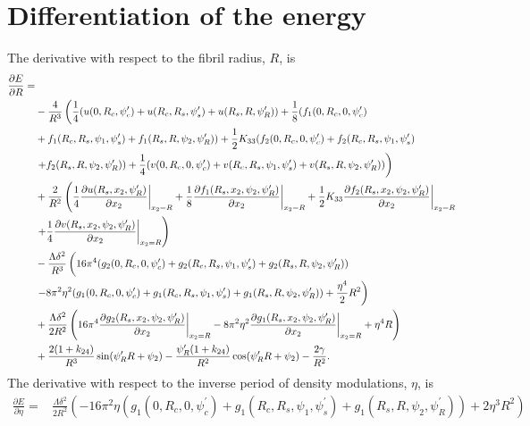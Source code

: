 \documentclass[12pt]{article}
\begin{document}
\section{Differentiation of the energy}
The derivative with respect to the fibril radius, $R$, is
\begin{align}
\frac{\partial E}{\partial R}=&\nonumber\\
&-\frac{4}{R^3}\left(\frac{1}{4}(u(0,R_c,\psi_c^{\prime})+u(R_c,R_s,\psi_s^{\prime})+u(R_s,R,\psi_R^{\prime}))+\frac{1}{8}(f_1(0,R_c,0,\psi_c^{\prime})\right.\nonumber\\
&+f_1(R_c,R_s,\psi_1,\psi_s^{\prime})+f_1(R_s,R,\psi_2,\psi_R^{\prime}))+\frac{1}{2}K_{33}(f_2(0,R_c,0,\psi_c^{\prime})+f_2(R_c,R_s,\psi_1,\psi_s^{\prime})\nonumber\\
&\left.+f_2(R_s,R,\psi_2,\psi_R^{\prime}))+\frac{1}{4}(v(0,R_c,0,\psi_c^{\prime})+v(R_c,R_s,\psi_1,\psi_s^{\prime})+v(R_s,R,\psi_2,\psi_R^{\prime}))\right)\nonumber\\
&+\frac{2}{R^2}\left(\frac{1}{4}\frac{\partial u(R_s,x_2,\psi_R^{\prime})}{\partial x_2}\bigg|_{x_2=R}+\frac{1}{8}\frac{\partial f_1(R_s,x_2,\psi_2,\psi_R^{\prime})}{\partial x_2}\bigg|_{x_2=R}+\frac{1}{2}K_{33}\frac{\partial f_2(R_s,x_2,\psi_2,\psi_R^{\prime})}{\partial x_2}\bigg|_{x_2=R}\right.\nonumber\\
&\left.+\frac{1}{4}\frac{\partial v(R_s,x_2,\psi_2,\psi_R^{\prime})}{\partial x_2}\bigg|_{x_2=R}\right)\nonumber\\
&-\frac{\Lambda\delta^2}{R^3}\left(\vphantom{\frac{1}{2}}16\pi^4(g_2(0,R_c,0,\psi_c^{\prime})+g_2(R_c,R_s,\psi_1,\psi_s^{\prime})+g_2(R_s,R,\psi_2,\psi_R^{\prime}))\right.\nonumber\\
&\left.-8\pi^2\eta^2(g_1(0,R_c,0,\psi_c^{\prime})+g_1(R_c,R_s,\psi_1,\psi_s^{\prime})+g_1(R_s,R,\psi_2,\psi_R^{\prime}))+\frac{\eta^4}{2}R^2\right)\nonumber\\
&+\frac{\Lambda\delta^2}{2R^2}\left(16\pi^4\frac{\partial g_2(R_s,x_2,\psi_2,\psi_R^{\prime})}{\partial x_2}\bigg|_{x_2=R}-8\pi^2\eta^2\frac{\partial g_1(R_s,x_2,\psi_2,\psi_R^{\prime})}{\partial x_2}\bigg|_{x_2=R}+\eta^4R\right)\nonumber\\
&+\frac{2(1+k_{24})}{R^3}\sin(\psi_R^{\prime}R+\psi_2)-\frac{\psi_R^{\prime}(1+k_{24})}{R^2}\cos(\psi_R^{\prime}R+\psi_2)-\frac{2\gamma}{R^2}.\label{eq:dEdR}
\end{align}
The derivative with respect to the inverse period of density modulations, $\eta$, is
\begin{align}
\frac{\partial E}{\partial \eta}=&
\frac{\Lambda\delta^2}{2R^2}\left(-16\pi^2\eta(g_1(0,R_c,0,\psi_c^{\prime})+g_1(R_c,R_s,\psi_1,\psi_s^{\prime})+g_1(R_s,R,\psi_2,\psi_R^{\prime}))+2\eta^3R^2\right)\label{eq:dEdeta}
\end{align}
\end{document}
